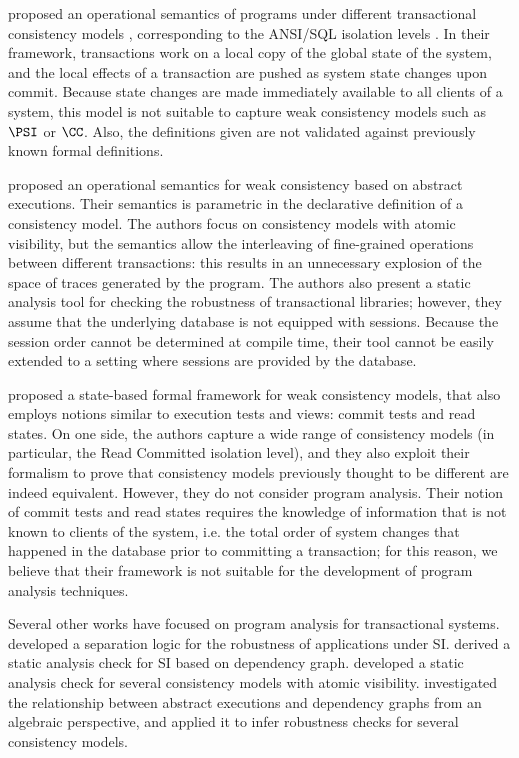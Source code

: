 
 proposed an operational semantics of programs 
under different transactional consistency models \cite{alonetogether}, 
corresponding to the ANSI/SQL isolation levels \cite{si}.
In their  framework, transactions work on a local copy of the global state 
of the system, and the local effects of a transaction are pushed as 
system state changes upon commit. Because state changes 
are made immediately available to all clients of a system, this model 
is not suitable to capture weak consistency models such as \(\PSI\) or \(\CC\). 
Also, the definitions given are not validated against previously known 
formal definitions.

 proposed an operational semantics for weak consistency 
based on abstract executions. Their semantics 
is parametric in the declarative definition of a consistency model. The authors 
focus on consistency models with atomic visibility, but the semantics allow 
the interleaving of fine-grained operations between different transactions: 
this results in an unnecessary explosion of the space of traces generated by 
the program. 
The authors also present a static analysis tool for checking the robustness of transactional  
libraries; however, they assume that the underlying database 
is not equipped with sessions. Because the session order cannot be determined at compile time, 
their tool cannot be easily extended to a setting where sessions are provided by the database. 

 proposed a state-based formal framework for weak consistency models, 
that also employs notions similar to execution tests and views: commit tests and read states.
On one side, the authors capture 
a wide range of consistency models (in particular, the Read Committed isolation level), 
and they also exploit their formalism to prove that consistency models previously thought to be different 
are indeed equivalent.
However, they do not consider program analysis. Their notion of commit tests and read states requires 
the knowledge of information that is not known to clients of the system, i.e. the total order of system changes that happened in the database 
prior to committing a transaction; for this reason, we believe that their framework is not suitable for the development of program analysis techniques.

Several other works have focused on program analysis for transactional systems. 
 developed a separation logic for
the robustness of applications under SI.  derived 
a static analysis check for SI based on dependency graph. 
developed a static analysis check for several consistency models with atomic visibility. 
 investigated the relationship between abstract 
executions and dependency graphs from an algebraic perspective, and applied it to infer 
robustness checks for several consistency models. 


